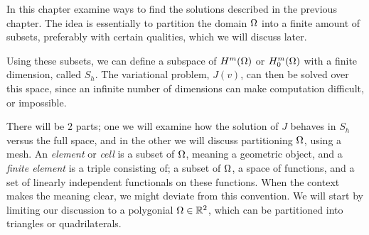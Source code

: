 In this chapter examine ways to find the solutions described in the previous chapter.
The idea is essentially to partition the domain $\Omega$ into a finite amount 
of subsets, preferably with certain qualities, which we will discuss later. 

Using these subsets, we can define a subspace of $H^m(\Omega)$ or $H^m_0(\Omega)$ 
with a finite dimension, called $S_h$. The variational problem, $J(v)$, can then be 
solved over this space, since an infinite number of dimensions can make 
computation difficult, or impossible.

There will be $2$ parts; one we 
will examine how the solution of $J$ behaves in $S_h$ versus the full space, 
and in the other we will discuss partitioning $\Omega$, using a mesh.
An \emph{element} or \emph{cell} is a 
subset of $\Omega$, meaning a geometric object, 
and a \emph{finite element} is a 
triple consisting of; a subset of $\Omega$, a space of functions, and a set of 
linearly independent functionals on these functions.
When the context makes the meaning clear, we might deviate from 
this convention.
We will start by limiting our discussion to a polygonial $\Omega \in \mathbb{R}^2$, which 
can be partitioned into triangles or quadrilaterals.